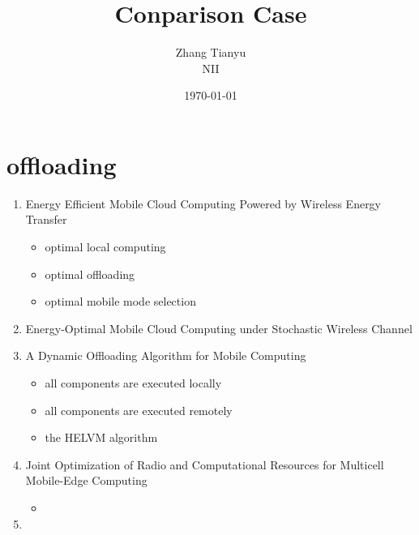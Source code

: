 \documentclass{article}
\title{Conparison Case}
\author{Zhang Tianyu \\
	 NII\\
	}
\date{\today}
\begin{document}
\maketitle



\section{offloading}

\begin{enumerate}
  \item Energy Efficient Mobile Cloud Computing Powered by Wireless Energy Transfer
    \begin{itemize}
      \item optimal local computing
      \item optimal offloading
      \item optimal mobile mode selection
    \end{itemize}
  \item Energy-Optimal Mobile Cloud Computing under Stochastic Wireless Channel
  \item A Dynamic Offloading Algorithm for Mobile Computing
    \begin{itemize}
      \item all components are executed locally
      \item all components are executed remotely
      \item the HELVM algorithm
    \end{itemize}
  \item Joint Optimization of Radio and Computational Resources for Multicell Mobile-Edge Computing
    \begin{itemize}
     \item
    \end{itemize}
  \item

\end{enumerate}
\end{document}
